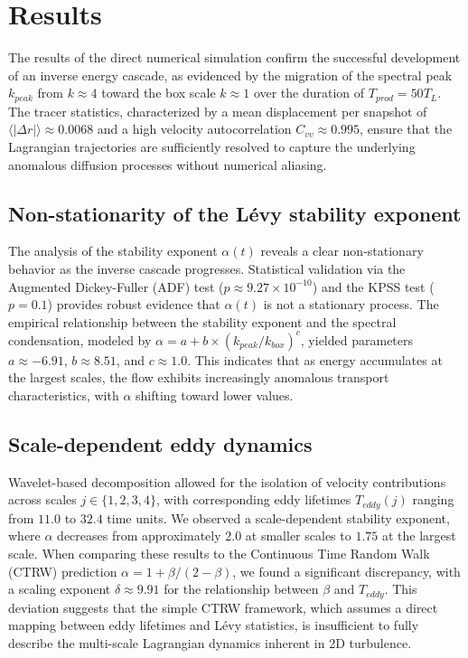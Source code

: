 \documentclass[]{article}
\begin{document}
\section{Results}
\label{sec:results}
The results of the direct numerical simulation confirm the successful development of an inverse energy cascade, as evidenced by the migration of the spectral peak $k_{peak}$ from $k \approx 4$ toward the box scale $k \approx 1$ over the duration of $T_{prod} = 50 T_L$. The tracer statistics, characterized by a mean displacement per snapshot of $\langle|\Delta r|\rangle \approx 0.0068$ and a high velocity autocorrelation $C_{vv} \approx 0.995$, ensure that the Lagrangian trajectories are sufficiently resolved to capture the underlying anomalous diffusion processes without numerical aliasing.

\subsection{Non-stationarity of the Lévy stability exponent}
The analysis of the stability exponent $\alpha(t)$ reveals a clear non-stationary behavior as the inverse cascade progresses. Statistical validation via the Augmented Dickey-Fuller (ADF) test ($p \approx 9.27 \times 10^{-10}$) and the KPSS test ($p = 0.1$) provides robust evidence that $\alpha(t)$ is not a stationary process. The empirical relationship between the stability exponent and the spectral condensation, modeled by $\alpha = a + b \times (k_{peak}/k_{box})^c$, yielded parameters $a \approx -6.91$, $b \approx 8.51$, and $c \approx 1.0$. This indicates that as energy accumulates at the largest scales, the flow exhibits increasingly anomalous transport characteristics, with $\alpha$ shifting toward lower values.

\subsection{Scale-dependent eddy dynamics}
Wavelet-based decomposition allowed for the isolation of velocity contributions across scales $j \in \{1, 2, 3, 4\}$, with corresponding eddy lifetimes $T_{eddy}(j)$ ranging from $11.0$ to $32.4$ time units. We observed a scale-dependent stability exponent, where $\alpha$ decreases from approximately $2.0$ at smaller scales to $1.75$ at the largest scale. When comparing these results to the Continuous Time Random Walk (CTRW) prediction $\alpha = 1 + \beta/(2-\beta)$, we found a significant discrepancy, with a scaling exponent $\delta \approx 9.91$ for the relationship between $\beta$ and $T_{eddy}$. This deviation suggests that the simple CTRW framework, which assumes a direct mapping between eddy lifetimes and Lévy statistics, is insufficient to fully describe the multi-scale Lagrangian dynamics inherent in 2D turbulence.
\end{document}

